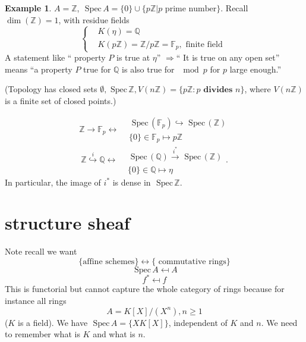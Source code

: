 \documentclass[11pt]{article}
\theoremstyle{definition}
\newtheorem{ex}[thm]{Example}
\newcommand{\spec}{\text{ Spec}\,}
\newcommand{\intg}{\mathbb Z}
\newcommand{\bbf}{\mathbb F}
\newcommand{\ratl}{\mathbb Q}
\newcommand{\Lrta}{\Longrightarrow}
\newcommand{\lrta}{\longrightarrow}
\newcommand{\llrta}{\longleftrightarrow}
\newcommand{\inj}{\hookrightarrow}
\begin{document}
\begin{ex}
$A=\intg$, $\spec A=\{0\}\cup \{p\intg|p\text{ prime number}\}$.
Recall $\dim (\intg)=1$, with residue fields 
$$
\left\{\begin{aligned}
&K(\eta)=\ratl\\
&K(p\intg)=\intg/p\intg=\bbf_p, \text{  finite field }
\end{aligned}\right.
$$
A statement like `` property  $P$ is true at $\eta$'' $\Lrta $`` It is true on any open set'' means ``a property $P$ true for $\ratl$ is also true for $\mod p$ for $p$ large enough.''

(Topology has closed sets $\emptyset, \spec \intg, V(n\intg)=\{p\intg: p\textbf{ divides }n\}$, where $V(n\intg)$ is a finite set of closed points.)

$$
\intg\lrta \bbf_p\llrta \begin{aligned}
&\spec (\bbf_p)\inj \spec (\intg)\\
& \{0\}\in\bbf_p\mapsto  p\intg
\end{aligned}
$$
$$
\intg\overset{i}{\inj} \ratl\llrta \begin{aligned}
&\spec (\ratl)\overset{i^*}{\lrta} \spec (\intg)\\
& \{0\}\in\ratl\mapsto  \eta
\end{aligned}.
$$
In particular, the image of $i^*$ is dense in $\spec \intg$.
\end{ex}
\section*{structure sheaf}

Note recall we want
$$
\{\text{affine schemes}\}\llrta \{\text{ commutative rings}\}
$$
$$
\spec A\mapsfrom A
$$
$$
f^*\mapsfrom f
$$
This is functorial but cannot capture the whole category of rings because for instance all rings
$$
A=K[X]/(X^n), n\geq 1
$$
($K$ is a field). We have $\spec A=\{XK[X]\}$, independent of $K$ and $n$. We need to remember what is $K$ and  what is $n$.
\end{document}
